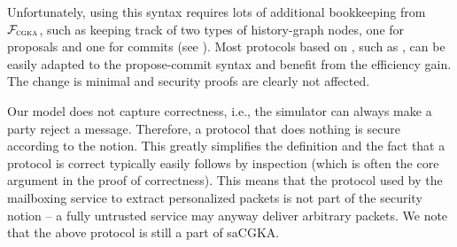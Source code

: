 \begin{description}[itemsep=0pt]
	Unfortunately, using this syntax requires lots of additional bookkeeping from $\mathcal{F}_{\normalfont\textsc{cgka}}$, such as keeping track of two types of history-graph nodes, one for proposals and one for commits (see  \cite{EPRINT:AlwJosMul20,hashimoto2021cmpke}). Most protocols based on \protITK, such as \saik, can be easily adapted to the propose-commit syntax and benefit from the efficiency gain. The change is minimal and security proofs are clearly not affected.
	
	\item [No correctness guarantees] Our model does not capture correctness, i.e., the simulator can always make a
      party reject a message. Therefore, a protocol that does nothing is secure according to the notion. This greatly
      simplifies the definition and the fact that a protocol is correct typically easily follows by inspection (which is
      often the core argument in the proof of correctness).
	This means that the protocol used by the mailboxing service to extract personalized packets is not part of the security notion -- a fully untrusted service may anyway deliver arbitrary packets. We note that the above protocol is still a part of saCGKA.
\end{description}
